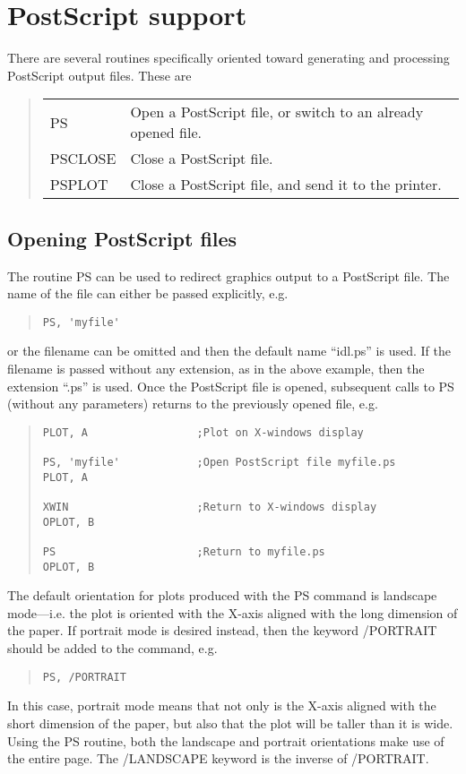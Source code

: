 \section{PostScript support}

There are several routines specifically oriented toward generating and
processing PostScript output files.  These are
\begin{quote}
\begin{tabular}{ll}
PS		& Open a PostScript file, or switch to an already opened
		  file.\\
PSCLOSE		& Close a PostScript file.\\
PSPLOT		& Close a PostScript file, and send it to the printer.
\end{tabular}
\end{quote}

\subsection{Opening PostScript files}

The routine PS can be used to redirect graphics output to a PostScript file.
The name of the file can either be passed explicitly, e.g.
\begin{quote}
\begin{verbatim}
PS, 'myfile'
\end{verbatim}
\end{quote}
or the filename can be omitted and then the default name ``idl.ps'' is used.
If the filename is passed without any extension, as in the above example, then
the extension ``.ps'' is used.  Once the PostScript file is opened, subsequent
calls to PS (without any parameters) returns to the previously opened file,
e.g.
\begin{quote}
\begin{verbatim}
PLOT, A                 ;Plot on X-windows display

PS, 'myfile'            ;Open PostScript file myfile.ps
PLOT, A

XWIN                    ;Return to X-windows display
OPLOT, B

PS                      ;Return to myfile.ps
OPLOT, B
\end{verbatim}
\end{quote}

The default orientation for plots produced with the PS command is landscape
mode---i.e. the plot is oriented with the X-axis aligned with the long
dimension of the paper.  If portrait mode is desired instead, then the keyword
/PORTRAIT should be added to the command, e.g.
\begin{quote}
\begin{verbatim}
PS, /PORTRAIT
\end{verbatim}
\end{quote}
In this case, portrait mode means that not only is the X-axis aligned with the
short dimension of the paper, but also that the plot will be taller than it is
wide.  Using the PS routine, both the landscape and portrait orientations make
use of the entire page.  The /LANDSCAPE keyword is the inverse of /PORTRAIT.

